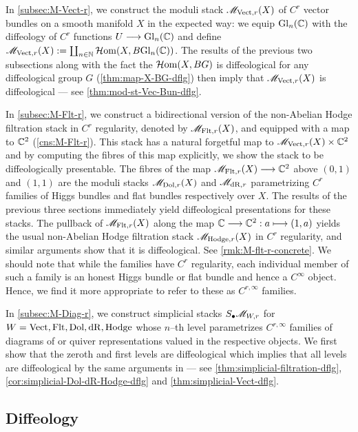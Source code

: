 \documentclass[11pt]{amsart}
\begin{document}
In \cref{subsec:M-Vect-r}, we construct the moduli stack $\mathscr{M}_{\mathrm{Vect}, r}(X)$ of $C^r$ vector bundles
on a smooth manifold $X$ in the expected way: we equip $\mathrm{Gl}_n(\mathbb{C})$ with the diffeology of $C^r$
functions $U \to \Gl_n(\bC)$ and define
$\mathscr{M}_{\mathrm{Vect}, r}(X) := \coprod_{n \in \mathbb{N}} \mathcal{H}\mathrm{om}(X, B\mathrm{Gl}_n(\mathbb{C}))$.
The results of the previous two subsections along with the fact the $\mathcal{H}\mathrm{om}(X, BG)$ is diffeological
for any diffeological group $G$ (\cref{thm:map-X-BG-dflg}) then imply that $\mathscr{M}_{\mathrm{Vect}, r}(X)$ is
diffeological --- see \cref{thm:mod-st-Vec-Bun-dflg}.

In \cref{subsec:M-Flt-r}, we construct a bidirectional version of the non-Abelian Hodge filtration
stack in $C^r$ regularity, denoted by $\mathscr{M}_{\mathrm{Flt}, r}(X)$, and equipped with a map
to $\mathbb{C}^2$ (\cref{cns:M-Flt-r}). This stack has a natural forgetful map
to $\mathscr{M}_{\mathrm{Vect}, r}(X) \times \mathbb{C}^2$ and by computing the fibres of this map explicitly, we show
the stack to be diffeologically presentable.
The fibres of the map $\sM_{\Flt, r}(X) \to \bC^2$ above $(0, 1)$ and $(1, 1)$ are
the moduli stacks $\mathscr{M}_{\mathrm{Dol}, r}(X)$ and $\mathscr{M}_{\mathrm{dR}, r}$ parametrizing $C^r$ families of Higgs
bundles and flat bundles respectively over $X$.
The results of the previous three sections immediately yield diffeological presentations for these
stacks. The pullback of $\mathscr{M}_{\mathrm{Flt}, r}(X)$ along the map $\bC \to \bC^2 : a \mapsto (1, a)$
yields the usual non-Abelian Hodge filtration stack $\mathscr{M}_{\mathrm{Hodge}, r}(X)$ in $C^r$ regularity,
and similar arguments show that it is diffeological. See \cref{rmk:M-flt-r-concrete}.
We should note that while the families have
$C^r$ regularity, each individual member of such a family is an honest Higgs bundle or flat bundle
and hence a $C^\infty$ object. Hence, we find it more appropriate to refer to these as
$C^{r, \infty}$ families.

In \cref{subsec:M-Diag-r}, we construct simplicial stacks
$S_\bullet\mathscr{M}_{W, r}$ for $W = \mathrm{Vect}, \mathrm{Flt}, \mathrm{Dol}, \mathrm{dR}, \mathrm{Hodge}$ whose $n$--th level
parametrizes $C^{r, \infty}$ families of diagrams of or quiver representations valued in the
respective objects. We first show that the zeroth and first levels are diffeological which
implies that all levels are diffeological by the same arguments in \cite[\S 4]{ModStQuivBun}
--- see \cref{thm:simplicial-filtration-dflg}, \cref{cor:simplicial-Dol-dR-Hodge-dflg}
and \cref{thm:simplicial-Vect-dflg}.

\subsection{Diffeology}
\label{subsec:dflg}
\end{document}
